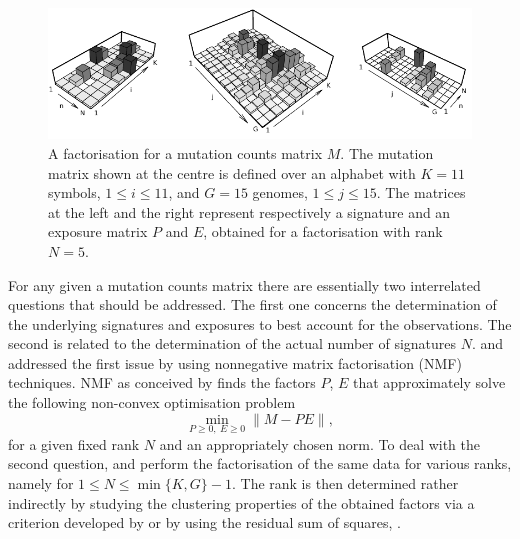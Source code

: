 \documentclass{bioinfo}
\begin{document}
\begin{figure}
  \centering\includegraphics[width=13.5cm]{figs/f_bw_t}
  \caption{\textrm{%
   A factorisation for a mutation counts matrix $M$. The
   mutation matrix shown at the centre is defined over an alphabet
   with $K=11$ symbols, $1 \leq i \leq 11$, and $G=15$
   genomes, $1\leq j\leq 15$. The matrices at the left and
   the right represent respectively a signature and an exposure matrix
   $P$ and $E$, obtained for a factorisation with rank $N=5$. 
   }
  }
 \label{fig:toyNMF}
\end{figure}


For any given a mutation counts matrix there are essentially two
interrelated questions that should be addressed. The first one
concerns the determination of the underlying signatures and exposures
to best account for the observations. The second is related to the
determination of the actual number of signatures $N$. \cite{NCell} and
\cite{A} addressed the first issue by using nonnegative matrix
factorisation (NMF) techniques.  NMF as conceived by \cite{LS} finds
the factors $P$, $E$ that approximately solve the following non-convex
optimisation problem
\begin{equation}
  \label{eqn:NMF}
    \min_{P\geq 0,\ E\geq 0}\|M - PE\|,
\end{equation}
for a given fixed rank $N$ and an appropriately chosen norm.
To deal with the second question, \cite{NCell} and \cite{A}
perform the factorisation of the same data for various ranks, namely
for $1 \leq N \leq \min\{K, G\}-1$. The rank is then determined rather 
indirectly by studying the clustering properties of the obtained
factors via a criterion developed by \cite{BTGM} or by using the 
residual sum of squares, \cite{HMSG}.
\end{document}
